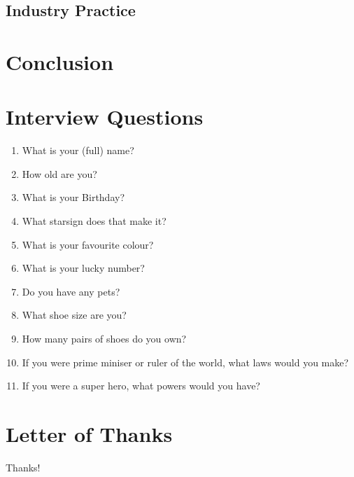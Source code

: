 \documentclass[letterpaper, 12pt]{report}
\begin{document}
\section{Industry Practice}

\chapter{Conclusion}

\appendix

\chapter{Interview Questions}
\begin{enumerate}[leftmargin=*]
	\item What is your (full) name?
	\item How old are you?
	\item What is your Birthday?
	\item What starsign does that make it?
	\item What is your favourite colour?
	\item What is your lucky number?
	\item Do you have any pets?
	\item What shoe size are you?
	\item How many pairs of shoes do you own?
	\item If you were prime miniser or ruler of the world, what laws would you make?
	\item If you were a super hero, what powers would you have?
\end{enumerate}

\chapter{Letter of Thanks}
Thanks!

% 
% 
{}
\printbibliography
\end{document}
